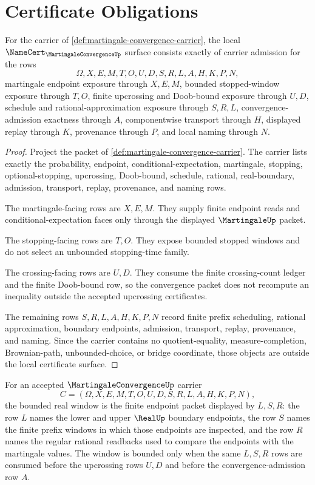 \section{Certificate Obligations}
\label{sec:martingale-convergence-obligations}

\begin{theorem}
\label{thm:martingale-convergence-namecert-obligations}
For the carrier of \autoref{def:martingale-convergence-carrier}, the local $\NameCert_{\MartingaleConvergenceUp}$ surface consists exactly of carrier admission for the rows
$$
\Omega,X,E,M,T,O,U,D,S,R,L,A,H,K,P,N,
$$
martingale endpoint exposure through $X,E,M$, bounded stopped-window exposure through $T,O$, finite upcrossing and Doob-bound exposure through $U,D$, schedule and rational-approximation exposure through $S,R,L$, convergence-admission exactness through $A$, componentwise transport through $H$, displayed replay through $K$, provenance through $P$, and local naming through $N$.
\end{theorem}
\begin{proof}
Project the packet of \autoref{def:martingale-convergence-carrier}. The carrier lists exactly the probability, endpoint, conditional-expectation, martingale, stopping, optional-stopping, upcrossing, Doob-bound, schedule, rational, real-boundary, admission, transport, replay, provenance, and naming rows.

The martingale-facing rows are $X,E,M$. They supply finite endpoint reads and conditional-expectation faces only through the displayed $\MartingaleUp$ packet.

The stopping-facing rows are $T,O$. They expose bounded stopped windows and do not select an unbounded stopping-time family.

The crossing-facing rows are $U,D$. They consume the finite crossing-count ledger and the finite Doob-bound row, so the convergence packet does not recompute an inequality outside the accepted upcrossing certificates.

The remaining rows $S,R,L,A,H,K,P,N$ record finite prefix scheduling, rational approximation, boundary endpoints, admission, transport, replay, provenance, and naming. Since the carrier contains no quotient-equality, measure-completion, Brownian-path, unbounded-choice, or bridge coordinate, those objects are outside the local certificate surface.
\end{proof}

\begin{definition}
\label{def:martingale-convergence-bounded-real-window}
For an accepted $\MartingaleConvergenceUp$ carrier
$$
C=(\Omega,X,E,M,T,O,U,D,S,R,L,A,H,K,P,N),
$$
the bounded real window is the finite endpoint packet displayed by $L,S,R$: the row $L$ names the lower and upper $\RealUp$ boundary endpoints, the row $S$ names the finite prefix windows in which those endpoints are inspected, and the row $R$ names the regular rational readbacks used to compare the endpoints with the martingale values. The window is bounded only when the same $L,S,R$ rows are consumed before the upcrossing rows $U,D$ and before the convergence-admission row $A$.
\end{definition}

